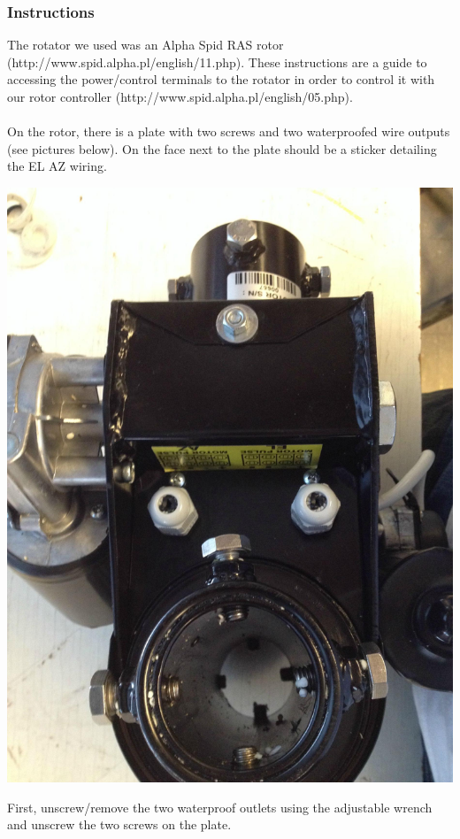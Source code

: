 \documentclass[11pt]{article} %
\begin{document}
\subsubsection{Instructions}

The rotator we used was an Alpha Spid RAS rotor (http://www.spid.alpha.pl/english/11.php). These instructions are a guide to accessing the power/control terminals to the rotator in order to control it with our rotor controller (http://www.spid.alpha.pl/english/05.php). \\ \\
On the rotor, there is a plate with two screws and two waterproofed wire outputs (see pictures below). On the face next to the plate should be a sticker detailing the EL AZ wiring.

\begin{center}
\includegraphics[scale=0.10]{wiring/01.jpeg}
\end{center}

First, unscrew/remove the two waterproof outlets using the adjustable wrench and unscrew the two screws on the plate.
\end{document}
